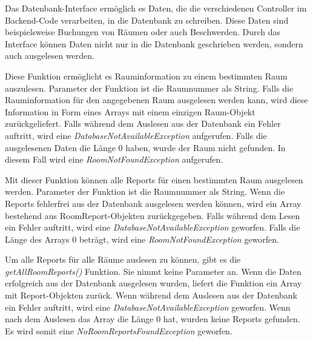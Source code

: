 


Das Datenbank-Interface ermöglich es Daten, die die verschiedenen Controller im Backend-Code verarbeiten, in die Datenbank zu schreiben. Diese Daten sind beispielsweise Buchungen von Räumen oder auch Beschwerden. Durch das Interface können Daten nicht nur in die Datenbank geschrieben werden, sondern auch ausgelesen werden.



Diese Funktion ermöglicht es Rauminformation zu einem bestimmten Raum auszulesen. Parameter der Funktion ist die Raumnummer als String. Falls die Rauminformation für den angegebenen Raum ausgelesen werden kann, wird diese Information in Form eines Arrays mit einem einzigen Raum-Objekt zurückgeliefert. Falls während dem Auslesen aus der Datenbank ein Fehler auftritt, wird eine \emph{DatabaseNotAvailableException} aufgerufen. Falls die ausgelesenen Daten die Länge 0 haben, wurde der Raum nicht gefunden. In diesem Fall wird eine \emph{RoomNotFoundException} aufgerufen.



Mit dieser Funktion können alle Reports für einen bestimmten Raum ausgelesen werden. Parameter der Funktion ist die Raumnummer als String. Wenn die Reports fehlerfrei aus der Datenbank ausgelesen werden können, wird ein Array bestehend aus RoomReport-Objekten zurückgegeben. Falls während dem Lesen ein Fehler auftritt, wird eine \emph{DatabaseNotAvailableException} geworfen. Falls die Länge des Arrays 0 beträgt, wird eine \emph{RoomNotFoundException} geworfen.


Um alle Reports für alle Räume auslesen zu können, gibt es die \emph{getAllRoomReports()} Funktion. Sie nimmt keine Parameter an. Wenn die Daten erfolgreich aus der Datenbank ausgelesen wurden, liefert die Funktion ein Array mit Report-Objekten zurück. Wenn während dem Auslesen aus der Datenbank ein Fehler auftritt, wird eine \emph{DatabaseNotAvailableException} geworfen. Wenn nach dem Auslesen das Array die Länge 0 hat, wurden keine Reports gefunden. Es wird somit eine \emph{NoRoomReportsFoundException} geworfen.

